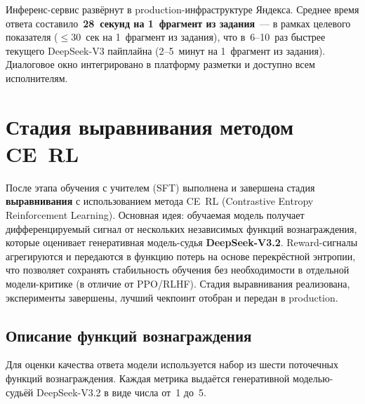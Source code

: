 \documentclass[times]{itmo-student-thesis}
\begin{document}
Инференс-сервис развёрнут в production-инфраструктуре Яндекса.
Среднее время ответа составило~\textbf{28~секунд на 1~фрагмент из задания}~--- в рамках
целевого показателя ($\le 30$~сек на 1~фрагмент из задания), что в~6–10~раз быстрее
текущего DeepSeek-V3 пайплайна (2–5~минут на 1~фрагмент из задания).
Диалоговое окно интегрировано в платформу разметки
и доступно всем исполнителям.

\section{Стадия выравнивания методом CE~RL}

После этапа обучения с учителем (SFT) выполнена и завершена стадия
\textbf{выравнивания} с использованием метода CE~RL (Contrastive Entropy
Reinforcement Learning). Основная идея: обучаемая модель получает
дифференцируемый сигнал от нескольких независимых функций вознаграждения,
которые оценивает генеративная модель-судья \textbf{DeepSeek-V3.2}.
Reward-сигналы агрегируются и передаются в функцию потерь на основе
перекрёстной энтропии, что позволяет сохранять стабильность обучения
без необходимости в отдельной модели-критике (в отличие от PPO/RLHF).
Стадия выравнивания реализована, эксперименты завершены, лучший чекпоинт
отобран и передан в production.

\subsection{Описание функций вознаграждения}

Для оценки качества ответа модели используется набор из шести
поточечных функций вознаграждения. Каждая метрика выдаётся генеративной
моделью-судьёй DeepSeek-V3.2 в виде числа от~1 до~5.
\end{document}
